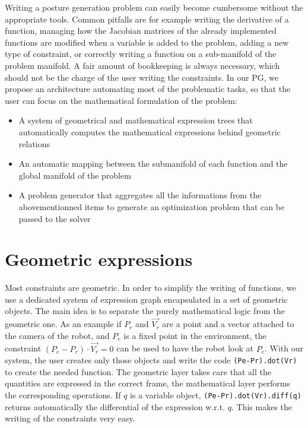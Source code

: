 Writing a posture generation problem can easily become cumbersome without the appropriate tools.
Common pitfalls are for example writing the derivative of a function, managing how the Jacobian matrices of the already implemented functions are modified when a variable is added to the problem, adding a new type of constraint, or correctly writing a function on a sub-manifold of the problem manifold.
A fair amount of bookkeeping is always necessary, which should not be the charge of the user writing the constraints.
In our PG, we propose an architecture automating most of the problematic tasks, so that the user can focus on the mathematical formulation of the problem:
\begin{itemize}
  \item A system of geometrical and mathematical expression trees that automatically computes the mathematical expressions behind geometric relations
  \item An automatic mapping between the submanifold of each function and the global manifold of the problem
  \item A problem generator that aggregates all the informations from the abovementionned items to generate an optimization problem that can be passed to the solver
\end{itemize}


\section{Geometric expressions}
\label{sec:geometric_expressions}

Most constraints are geometric.
In order to simplify the writing of functions, we use a dedicated system of expression graph encapsulated in a set of geometric objects.
The main idea is to separate the purely mathematical logic from the geometric one.
As an example if $P_r$ and $\overrightarrow{V_r}$ are a point and a vector attached to the camera of the robot, and $P_e$ is a fixed point in the environment, the constraint $(P_e - P_r)\cdot \overrightarrow{V_r} = 0$ can be used to have the robot look at $P_e$.
With our system, the user creates only those objects and write the code {\tt (Pe-Pr).dot(Vr)} to create the needed function.
The geometric layer takes care that all the quantities are expressed in the correct frame, the mathematical layer performs the corresponding operations.
If $q$ is a variable object, {\tt (Pe-Pr).dot(Vr).diff(q)} returns automatically the differential of the expression w.r.t. $q$. This makes the writing of the constraints very easy.

